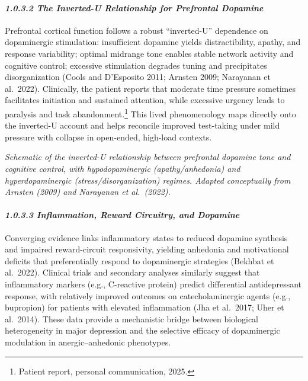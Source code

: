 \paragraph{\texorpdfstring{\emph{1.0.3.2 The Inverted-U Relationship for Prefrontal Dopamine}}{1.0.3.2 The Inverted-U Relationship for Prefrontal Dopamine}}\label{10b_traad-the-inverted-u-relationship-for-prefrontal-dopamine}

Prefrontal cortical function follows a robust ``inverted-U'' dependence on dopaminergic stimulation: insufficient dopamine yields distractibility, apathy, and response variability; optimal midrange tone enables stable network activity and cognitive control; excessive stimulation degrades tuning and precipitates disorganization (Cools and D'Esposito 2011; Arnsten 2009; Narayanan et al.~2022). Clinically, the patient reports that moderate time pressure sometimes facilitates initiation and sustained attention, while excessive urgency leads to paralysis and task abandonment.\footnote{Patient report, personal communication, 2025.} This lived phenomenology maps directly onto the inverted-U account and helps reconcile improved test-taking under mild pressure with collapse in open-ended, high-load contexts.

\emph{Schematic of the inverted-U relationship between prefrontal dopamine tone and cognitive control, with hypodopaminergic (apathy/anhedonia) and hyperdopaminergic (stress/disorganization) regimes. Adapted conceptually from Arnsten (2009) and Narayanan et al.~(2022).}

\paragraph{\texorpdfstring{\emph{1.0.3.3 Inflammation, Reward Circuitry, and Dopamine}}{1.0.3.3 Inflammation, Reward Circuitry, and Dopamine}}\label{10b_traad-inflammation-reward-circuitry-and-dopamine}

Converging evidence links inflammatory states to reduced dopamine synthesis and impaired reward-circuit responsivity, yielding anhedonia and motivational deficits that preferentially respond to dopaminergic strategies (Bekhbat et al.~2022). Clinical trials and secondary analyses similarly suggest that inflammatory markers (e.g., C-reactive protein) predict differential antidepressant response, with relatively improved outcomes on catecholaminergic agents (e.g., bupropion) for patients with elevated inflammation (Jha et al.~2017; Uher et al.~2014). These data provide a mechanistic bridge between biological heterogeneity in major depression and the selective efficacy of dopaminergic modulation in anergic--anhedonic phenotypes.


